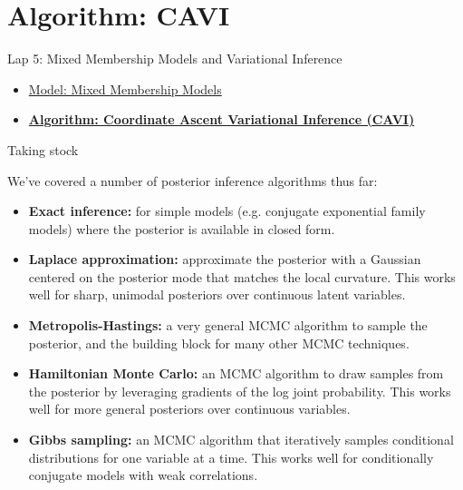 \documentclass[aspectratio=169]{beamer}
\begin{document}

    

\section{Algorithm: CAVI}
\label{sec:cavi}

\begin{frame}{Lap 5: Mixed Membership Models and Variational Inference}
\begin{itemize}
    \item \hyperref[sec:models]{Model: Mixed Membership Models}
    \item \hyperref[sec:cavi]{\textbf{Algorithm: Coordinate Ascent Variational Inference (CAVI)}}
\end{itemize}
\end{frame}

\begin{frame}{Taking stock}
    
We've covered a number of posterior inference algorithms thus far:
\begin{itemize}
    \item \textbf{Exact inference:} for simple models (e.g. conjugate exponential family models) where the posterior is available in closed form.
    
    \item \textbf{Laplace approximation:} approximate the posterior with a Gaussian centered on the posterior mode that matches the local curvature. This works well for sharp, unimodal posteriors over continuous latent variables.
    
    \item \textbf{Metropolis-Hastings: } a very general MCMC algorithm to sample the posterior, and the building block for many other MCMC techniques.
    
    \item \textbf{Hamiltonian Monte Carlo: } an MCMC algorithm to draw samples from the posterior by leveraging gradients of the log joint probability. This works well for more general posteriors over continuous variables.
    
    \item \textbf{Gibbs sampling:} an MCMC algorithm that iteratively samples conditional distributions for one variable at a time. This works well for conditionally conjugate models with weak correlations.
\end{itemize}
\end{frame}
\end{document}
